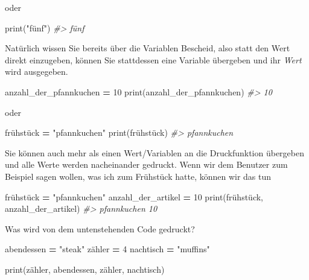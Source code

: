 \documentclass[
]{book}
\newenvironment{Shaded}{\begin{snugshade}}{\end{snugshade}}
\newcommand{\BuiltInTok}[1]{#1}
\newcommand{\CommentTok}[1]{\textcolor[rgb]{0.56,0.35,0.01}{\textit{#1}}}
\newcommand{\DecValTok}[1]{\textcolor[rgb]{0.00,0.00,0.81}{#1}}
\newcommand{\NormalTok}[1]{#1}
\newcommand{\OperatorTok}[1]{\textcolor[rgb]{0.81,0.36,0.00}{\textbf{#1}}}
\newcommand{\StringTok}[1]{\textcolor[rgb]{0.31,0.60,0.02}{#1}}
\begin{document}
oder

\begin{Shaded}
\begin{Highlighting}[]
\BuiltInTok{print}\NormalTok{(}\StringTok{"fünf"}\NormalTok{)}
\CommentTok{\#\textgreater{} fünf}
\end{Highlighting}
\end{Shaded}

Natürlich wissen Sie bereits über die Variablen Bescheid, also statt den Wert direkt einzugeben, können Sie stattdessen eine Variable übergeben und ihr \emph{Wert} wird ausgegeben.

\begin{Shaded}
\begin{Highlighting}[]
\NormalTok{anzahl\_der\_pfannkuchen }\OperatorTok{=} \DecValTok{10}
\BuiltInTok{print}\NormalTok{(anzahl\_der\_pfannkuchen)}
\CommentTok{\#\textgreater{} 10}
\end{Highlighting}
\end{Shaded}

oder

\begin{Shaded}
\begin{Highlighting}[]
\NormalTok{frühstück }\OperatorTok{=} \StringTok{"pfannkuchen"}
\BuiltInTok{print}\NormalTok{(frühstück)}
\CommentTok{\#\textgreater{} pfannkuchen}
\end{Highlighting}
\end{Shaded}

Sie können auch mehr als einen Wert/Variablen an die Druckfunktion übergeben und alle Werte werden nacheinander gedruckt. Wenn wir dem Benutzer zum Beispiel sagen wollen, was ich zum Frühstück hatte, können wir das tun

\begin{Shaded}
\begin{Highlighting}[]
\NormalTok{frühstück }\OperatorTok{=} \StringTok{"pfannkuchen"}
\NormalTok{anzahl\_der\_artikel }\OperatorTok{=} \DecValTok{10}
\BuiltInTok{print}\NormalTok{(frühstück, anzahl\_der\_artikel)}
\CommentTok{\#\textgreater{} pfannkuchen 10}
\end{Highlighting}
\end{Shaded}

Was wird von dem untenstehenden Code gedruckt?

\begin{Shaded}
\begin{Highlighting}[]
\NormalTok{abendessen }\OperatorTok{=} \StringTok{"steak"}
\NormalTok{zähler }\OperatorTok{=} \DecValTok{4}
\NormalTok{nachtisch }\OperatorTok{=} \StringTok{"muffins"}

\BuiltInTok{print}\NormalTok{(zähler, abendessen, zähler, nachtisch)}
\end{Highlighting}
\end{Shaded}
\end{document}
